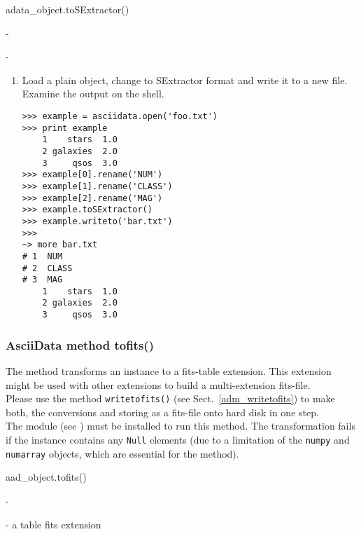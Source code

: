  adata\_object.toSExtractor()

-

-

\begin{enumerate}
\item Load a plain \ad object, change to SExtractor format and
write it to a new file. Examine the output on the shell.
\begin{verbatim}
>>> example = asciidata.open('foo.txt')
>>> print example
    1    stars  1.0
    2 galaxies  2.0
    3     qsos  3.0
>>> example[0].rename('NUM')
>>> example[1].rename('CLASS')
>>> example[2].rename('MAG')
>>> example.toSExtractor()
>>> example.writeto('bar.txt')
>>>
~> more bar.txt
# 1  NUM
# 2  CLASS
# 3  MAG
    1    stars  1.0
    2 galaxies  2.0
    3     qsos  3.0
\end{verbatim}
\end{enumerate}

\subsubsection{AsciiData method tofits()}
\label{adm_tofits}
%
The method transforms an \ad instance to a fits-table extension. This
extension might be used with other extensions to build a multi-extension
fits-file.\\
Please use the \ad method {\tt writetofits()}
(see Sect.\ \ref{adm_writetofits}) to make both, the conversions and
storing as a fits-file onto hard disk in one step.\\
The module  (see )
must be installed to run this method. The transformation fails if the
\ad instance contains any {\tt Null} elements (due to a limitation
of the {\tt numpy} and {\tt numarray} objects, which are essential for the
method).


aad\_object.tofits()

-

- a table fits extension

